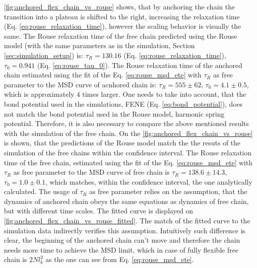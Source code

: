 \documentclass[
    paper=A4,pagesize=automedia,fontsize=12pt,
    BCOR=15mm,DIV=22,
    twoside,headinclude,footinclude=false,
    fleqn,             %
    bibliography=totocnumbered,          %
    listof=totoc,                %
    listof=flat,                 %
    cleardoublepage=empty      %
    numbers=endperiod
]{scrartcl}
\begin{document}
\autoref{fig:anchored_flex_chain_vs_rouse} shows, that by anchoring the chain
the transition into a plateau is shifted to the right, increasing the 
relaxation time (Eq. \ref{eq:rouse_relaxation_time}), 
however the scaling behavior is visually the same. The Rouse relaxation time
of the free chain predicted using the Rouse model 
(with the same parameters as in the simulation, Section \ref{sec:simulation_setup})
is: $\tau_R=130.16$ (Eq. \ref{eq:rouse_relaxation_time}), 
$\tau_0=0.941$ (Eq. \ref{eq:rouse_tau_0}). 
The Rouse relaxation time of the anchored chain estimated 
using the fit of the Eq. \ref{eq:rouse_msd_ete} with $\tau_R$ as free parameter
to the MSD curve of acnhored chain is: 
$\tau_R=555 \pm 62$, $\tau_0=4.1 \pm 0.5$, which is approximately $4$ times
larger. One needs to take into account, that the bond potential used in the simulations, 
FENE (Eq. \ref{eq:bond_potential}), does not match the bond potential 
used in the Rouse model, harmonic spring potential. Therefore, it is also 
necessary to compare the above mentioned results with the simulation of the free chain.
On the \autoref{fig:anchored_flex_chain_vs_rouse} is shown, that the predictions
of the Rouse model match the the resuts of the simulation of the free chains within the
confidence interval. The Rouse relaxation time of the free chain, estimated 
using the fit of the Eq. \ref{eq:rouse_msd_ete} with $\tau_R$ as free parameter
to the MSD curve of free chain is $\tau_R=138.6 \pm 14.3$, $\tau_0=1.0 \pm 0.1$,
which matches, within the confidence interval, the one analytically calculated.
The usage of $\tau_R$ as free parameter relies on the assumption, that
the dynamics of anchored chain obeys the same equations as dynamics of free chain, 
but with different time scales. The fitted curve is displayed on
\autoref{fig:anchored_flex_chain_vs_rouse_fitted}. The match of 
the fitted curve to the simulation data indirectly verifies this assumption.
Intuitively such difference is clear, the beginning of the anchored chain
can't move and therefore the chain needs more time to achieve the MSD limit, which
in case of fully flexible free chain is $2Nl_b^2$ as the one can see from Eq. \ref{eq:rouse_msd_ete}. 
\end{document}

